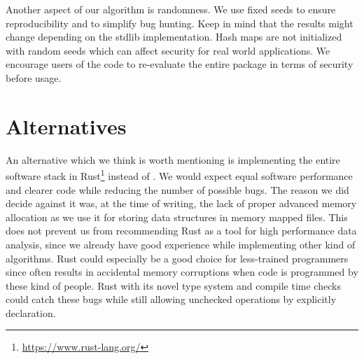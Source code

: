 Another aspect of our algorithm is randomness. We use fixed seeds to ensure reproducibility and to simplify bug hunting. Keep in mind that the results might change depending on the stdlib implementation. Hash maps are not initialized with random seeds which can affect security for real world applications. We encourage users of the code to re-evaluate the entire package in terms of security before usage.



\section{Alternatives}
\label{sec:implementation:alternatives}

An alternative which we think is worth mentioning is implementing the entire software stack in Rust\footnote{\url{https://www.rust-lang.org/}} instead of \Cpp{}. We would expect equal software performance and clearer code while reducing the number of possible bugs. The reason we did decide against it was, at the time of writing, the lack of proper advanced memory allocation as we use it for storing data structures in memory mapped files. This does not prevent us from recommending Rust as a tool for high performance data analysis, since we already have good experience while implementing other kind of algorithms. Rust could especially be a good choice for less-trained programmers since \Cpp{} often results in accidental memory corruptions when code is programmed by these kind of people. Rust with its novel type system and compile time checks could catch these bugs while still allowing unchecked operations by explicitly declaration.
